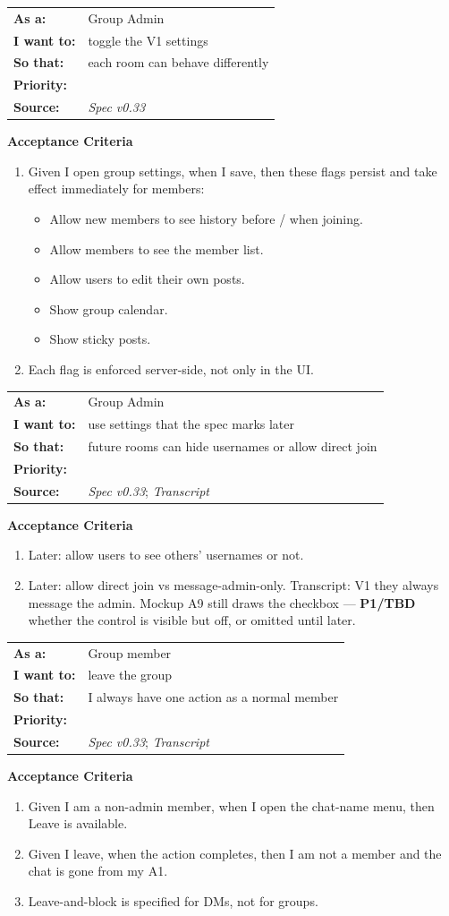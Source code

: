 \documentclass[11pt,a4paper]{article}
\makeatletter
\newcommand{\priPzero}{\colorbox{p0}{\makebox[4.6em]{\textcolor{white}{\scriptsize\bfseries P0 V1}}}}
\newcommand{\priPtwo}{\colorbox{p2}{\makebox[4.6em]{\textcolor{white}{\scriptsize\bfseries P2 Later}}}}
\newcommand{\srcSpec}{\textit{Spec v0.33}}
\newcommand{\srcTx}{\textit{Transcript}}
\newenvironment{story}[1]{%
  \Needspace{10\baselineskip}%
  \vspace{0.7em}%
  \noindent
  \colorbox{navy}{\makebox[\dimexpr\textwidth-2\fboxsep\relax][l]{\textcolor{white}{\bfseries\ #1}}}%
  \par\vspace{0.35em}%
}{\par\vspace{0.55em}}
\newcommand{\storymeta}[5]{%
  \noindent
  \begin{tabularx}{\textwidth}{@{}>{\bfseries}l X@{}}
    As a: & #1 \\
    I want to: & #2 \\
    So that: & #3 \\
    Priority: & #4 \\
    Source: & #5 \\
  \end{tabularx}
  \par\vspace{0.3em}
}
\newcommand{\achead}{\noindent\textbf{Acceptance Criteria}\par}
\makeatother
\begin{document}
\begin{story}{GROUP-010 --- V1 group settings}
\storymeta{Group Admin}{toggle the V1 settings}{each room can behave differently}{\priPzero}{\srcSpec}
\achead
\begin{enumerate}
  \item Given I open group settings, when I save, then these flags persist and take effect immediately for members:
  \begin{itemize}
    \item Allow new members to see history before / when joining.
    \item Allow members to see the member list.
    \item Allow users to edit their own posts.
    \item Show group calendar.
    \item Show sticky posts.
  \end{itemize}
  \item Each flag is enforced server-side, not only in the UI.
\end{enumerate}
\end{story}

\begin{story}{GROUP-011 --- Later group settings}
\storymeta{Group Admin}{use settings that the spec marks later}{future rooms can hide usernames or allow direct join}{\priPtwo}{\srcSpec; \srcTx}
\achead
\begin{enumerate}
  \item Later: allow users to see others' usernames or not.
  \item Later: allow direct join vs message-admin-only. Transcript: V1 they always message the admin. Mockup A9 still draws the checkbox --- \textbf{P1/TBD} whether the control is visible but off, or omitted until later.
\end{enumerate}
\end{story}

\begin{story}{GROUP-012 --- Leave a group}
\storymeta{Group member}{leave the group}{I always have one action as a normal member}{\priPzero}{\srcSpec; \srcTx}
\achead
\begin{enumerate}
  \item Given I am a non-admin member, when I open the chat-name menu, then Leave is available.
  \item Given I leave, when the action completes, then I am not a member and the chat is gone from my A1.
  \item Leave-and-block is specified for DMs, not for groups.
\end{enumerate}
\end{story}
\end{document}
